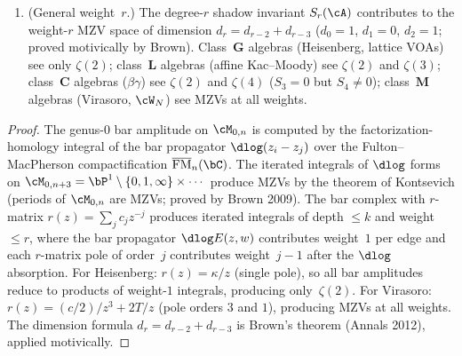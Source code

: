 \begin{theorem}
\begin{enumerate}[label=\textup{(\roman*)}]
\item \textup{(General weight~$r$.)}
The degree-$r$ shadow invariant $S_r(\cA)$ contributes to
the weight-$r$ MZV space of dimension
$d_r = d_{r-2} + d_{r-3}$ \textup{(}$d_0 = 1$, $d_1 = 0$,
$d_2 = 1$; proved motivically by Brown\textup{)}.
Class~$\mathbf{G}$ algebras
\textup{(}Heisenberg, lattice VOAs\textup{)} see only
$\zeta(2)$; class~$\mathbf{L}$ algebras
\textup{(}affine Kac--Moody\textup{)} see
$\zeta(2)$ and $\zeta(3)$;
class~$\mathbf{C}$ algebras
\textup{(}$\beta\gamma$\textup{)} see $\zeta(2)$ and $\zeta(4)$
\textup{(}$S_3 = 0$ but $S_4 \neq 0$\textup{)};
class~$\mathbf{M}$ algebras
\textup{(}Virasoro, $\cW_N$\textup{)} see MZVs at all weights.
\end{enumerate}
\end{theorem}

\begin{proof}
The genus-$0$ bar amplitude on $\cM_{0,n}$ is computed by
the factorization-homology integral of the bar propagator
$\dlog(z_i - z_j)$ over the Fulton--MacPherson compactification
$\overline{\mathrm{FM}}_n(\bC)$. The iterated integrals of
$\dlog$ forms on $\cM_{0,n+3} = \bP^1 \setminus \{0, 1, \infty\}
\times \cdots$ produce MZVs by the theorem of Kontsevich
(periods of $\cM_{0,n}$ are MZVs; proved by Brown 2009).
The bar complex with $r$-matrix
$r(z) = \sum_{j} c_j z^{-j}$ produces iterated integrals
of depth $\leq k$ and weight $\leq r$, where the bar
propagator $\dlog E(z,w)$ contributes weight~$1$ per edge
 and each $r$-matrix pole of order~$j$ contributes
weight~$j{-}1$ after the $\dlog$ absorption.
For Heisenberg: $r(z) = \kappa/z$ (single pole), so all
bar amplitudes reduce to products of weight-$1$ integrals,
producing only~$\zeta(2)$.
For Virasoro: $r(z) = (c/2)/z^3 + 2T/z$ (pole orders $3$ and $1$),
producing MZVs at all weights.
The dimension formula $d_r = d_{r-2} + d_{r-3}$ is Brown's
theorem (Annals 2012), applied motivically.
\end{proof}

